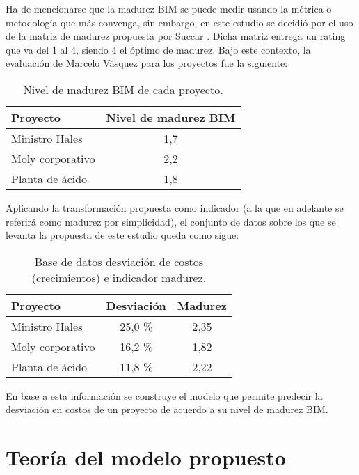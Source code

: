 Ha de mencionarse que la madurez BIM se puede medir usando la métrica o metodología que más convenga, sin embargo, en este estudio se decidió por el uso de la matriz de madurez propuesta por Succar \cite{succar2010building}. Dicha matriz entrega un rating que va del 1 al 4, siendo 4 el óptimo de madurez. Bajo este contexto, la evaluación de Marcelo Vásquez para los proyectos fue la siguiente:

\begin{table}[H]
    \centering
    \label{tab.datos_mad_bim}
    \caption{Nivel de madurez BIM de cada proyecto.}
    \begin{tabular}{lc}
        \toprule 
        \textbf{Proyecto} & \textbf{Nivel de madurez BIM} \\
        \midrule
        Ministro Hales & 1,7 \\
        Moly corporativo & 2,2 \\
        Planta de ácido &  1,8 \\
        \bottomrule
    \end{tabular}
\end{table}

Aplicando la transformación propuesta como indicador (a la que en adelante se referirá como madurez por simplicidad), el conjunto de datos sobre los que se levanta la propuesta de este estudio queda como sigue:

\begin{table}[H]
    \centering
    \label{tab.datos_mad_bim_desv}
    \caption{Base de datos desviación de costos (crecimientos) e indicador madurez.}
    \begin{tabular}{lcc}
        \toprule 
        \textbf{Proyecto} & \textbf{Desviación} & \textbf{Madurez} \\
        \midrule
        Ministro Hales & 25,0 \% & 2,35 \\
        Moly corporativo & 16,2 \% & 1,82 \\
        Planta de ácido & 11,8 \% & 2,22 \\
        \bottomrule
    \end{tabular}
\end{table}


En base a esta información se construye el modelo que permite predecir la desviación en costos de un proyecto de acuerdo a su nivel de madurez BIM.

\section{Teoría del modelo propuesto}

